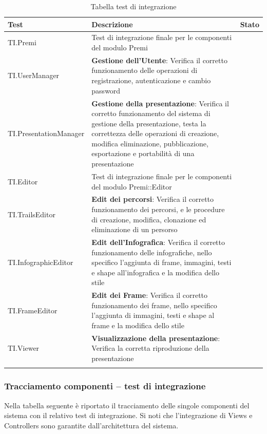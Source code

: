 \begin{longtable}{|p{4.5cm}|p{7cm}|p{2.5cm}|}
	\hline
	\textbf{Test} & \textbf{Descrizione} & \textbf{Stato} \\
	\hline
	TI.Premi & Test di integrazione finale per le componenti del modulo Premi & \teststatus \\
	\hline
	TI.UserManager & \textbf{Gestione dell'Utente}: Verifica il corretto funzionamento delle operazioni di registrazione, autenticazione e cambio password & \teststatus \\
	\hline
	TI.PresentationManager & \textbf{Gestione della presentazione}: Verifica il corretto funzionamento del sistema di gestione della presentazione, testa la correttezza delle operazioni di creazione, modifica eliminazione, pubblicazione, esportazione e portabilità di una presentazione& \teststatus \\
	\hline
	TI.Editor & Test di integrazione finale per le componenti del modulo Premi::Editor & \teststatus \\
	\hline
	TI.TrailsEditor & \textbf{Edit dei percorsi}: Verifica il corretto funzionamento dei percorsi, e le procedure di creazione, modifica, clonazione ed eliminazione di un persorso & \teststatus \\
	\hline
	TI.InfographicEditor & \textbf{Edit dell'Infografica}: Verifica il corretto funzionamento delle infografiche, nello specifico l'aggiunta di frame, immagini, testi e shape all'infografica e la modifica dello stile& \teststatus \\
	\hline
	TI.FrameEditor & \textbf{Edit dei Frame}: Verifica il corretto funzionamento dei frame, nello specifico l'aggiunta di immagini, testi e shape al frame e la modifica dello stile & \teststatus \\
	\hline
	TI.Viewer & \textbf{Visualizzazione della presentazione}: Verifica la corretta riproduzione della presentazione& \teststatus \\
	\hline
	\caption{Tabella test di integrazione}
\end{longtable}

\subsubsection{Tracciamento componenti – test di integrazione}

Nella tabella seguente è riportato il tracciamento delle singole componenti del sistema con il relativo test di integrazione. Si noti che l'integrazione di Views e Controllers sono garantite dall'architettura del sistema.

